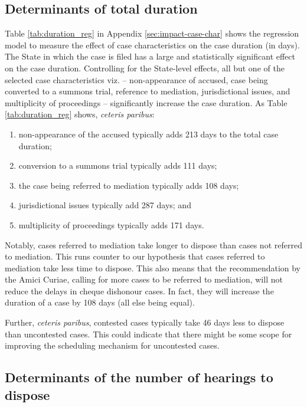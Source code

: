 \subsection{Determinants of total duration} \label{sec:determ-total-durat}

Table \ref{tab:duration_reg} in Appendix \ref{sec:impact-case-char} shows the regression model to measure the effect of case characteristics on the case duration (in days). The State in which the case is filed has a large and statistically significant effect on the case duration. Controlling for the State-level effects, all but one of the selected case characteristics viz. -- non-appearance of accused, case being converted to a summons trial, reference to mediation, jurisdictional issues, and multiplicity of proceedings -- significantly increase the case duration. As Table \ref{tab:duration_reg} shows, \emph{ceteris paribus}:

\begin{enumerate}
\item non-appearance of the accused typically adds 213 days to the total case duration;
\item conversion to a summons trial typically adds 111 days;
\item the case being referred to mediation typically adds 108 days;
\item jurisdictional issues typically add 287 days; and
\item multiplicity of proceedings typically adds 171 days.
\end{enumerate}

Notably, cases referred to mediation take longer to dispose than cases not referred to mediation. This runs counter to our hypothesis that cases referred to mediation take less time to dispose. This also means that the recommendation by the Amici Curiae, calling for more cases to be referred to mediation, will not reduce the delays in cheque dishonour cases. In fact, they will increase the duration of a case by 108 days (all else being equal).

Further, \emph{ceteris paribus}, contested cases typically take 46 days less to dispose than uncontested cases. This could indicate that there might be some scope for improving the scheduling mechanism for uncontested cases.

\subsection{Determinants of the number of hearings to dispose} \label{sec:determ-numb-hear}

